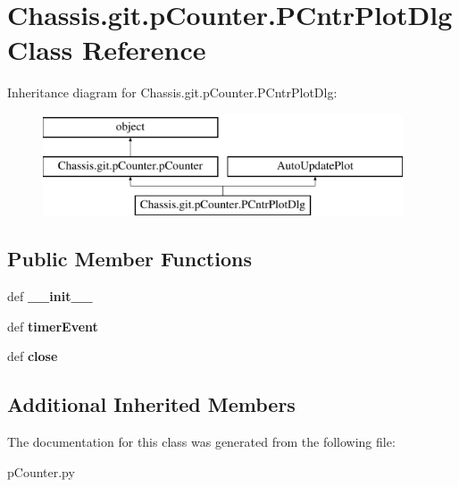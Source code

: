 \hypertarget{class_chassis_8git_1_1p_counter_1_1_p_cntr_plot_dlg}{\section{Chassis.\-git.\-p\-Counter.\-P\-Cntr\-Plot\-Dlg Class Reference}
\label{class_chassis_8git_1_1p_counter_1_1_p_cntr_plot_dlg}
}
Inheritance diagram for Chassis.\-git.\-p\-Counter.\-P\-Cntr\-Plot\-Dlg\-:\begin{figure}[H]
\begin{center}
\leavevmode
\includegraphics[height=3.000000cm]{class_chassis_8git_1_1p_counter_1_1_p_cntr_plot_dlg}
\end{center}
\end{figure}
\subsection*{Public Member Functions}
\begin{DoxyCompactItemize}
\item 
\hypertarget{class_chassis_8git_1_1p_counter_1_1_p_cntr_plot_dlg_aa007ff3906b5deb476cf9609dcc7e6f2}{def {\bfseries \-\_\-\-\_\-init\-\_\-\-\_\-}}\label{class_chassis_8git_1_1p_counter_1_1_p_cntr_plot_dlg_aa007ff3906b5deb476cf9609dcc7e6f2}

\item 
\hypertarget{class_chassis_8git_1_1p_counter_1_1_p_cntr_plot_dlg_ad0867110470e74ca35341e228c5c71b3}{def {\bfseries timer\-Event}}\label{class_chassis_8git_1_1p_counter_1_1_p_cntr_plot_dlg_ad0867110470e74ca35341e228c5c71b3}

\item 
\hypertarget{class_chassis_8git_1_1p_counter_1_1_p_cntr_plot_dlg_a42b40ddec94b425c461bcf79a6062dcb}{def {\bfseries close}}\label{class_chassis_8git_1_1p_counter_1_1_p_cntr_plot_dlg_a42b40ddec94b425c461bcf79a6062dcb}

\end{DoxyCompactItemize}
\subsection*{Additional Inherited Members}


The documentation for this class was generated from the following file\-:\begin{DoxyCompactItemize}
\item 
p\-Counter.\-py\end{DoxyCompactItemize}
